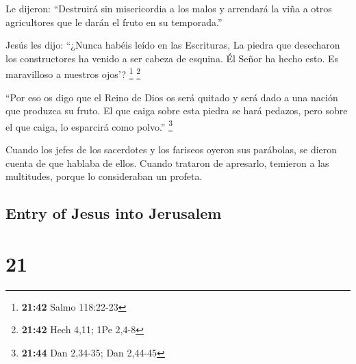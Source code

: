 \begin{paracol}{2}
 Le dijeron: ``Destruirá sin misericordia a los malos y
arrendará la viña a otros agricultores que le darán el fruto en su
temporada.''

 Jesús les dijo: ``¿Nunca habéis leído en las Escrituras,
La piedra que desecharon los constructores ha venido a ser cabeza de
esquina. Él Señor ha hecho esto. Es maravilloso a nuestros ojos'?
\footnote{\textbf{21:42} Salmo 118:22-23} \footnote{\textbf{21:42} Hech
  4,11; 1Pe 2,4-8}

 ``Por eso os digo que el Reino de Dios os será quitado y
será dado a una nación que produzca su fruto.  El que
caiga sobre esta piedra se hará pedazos, pero sobre el que caiga, lo
esparcirá como polvo.'' \footnote{\textbf{21:44} Dan 2,34-35; Dan
  2,44-45}

 Cuando los jefes de los sacerdotes y los fariseos oyeron
sus parábolas, se dieron cuenta de que hablaba de ellos. 
Cuando trataron de apresarlo, temieron a las multitudes, porque lo
consideraban un profeta.

\switchcolumn
\begin{otherlanguage}{english}

\hypertarget{entry-of-jesus-into-jerusalem}{%
\subsection{Entry of Jesus into
Jerusalem}\label{entry-of-jesus-into-jerusalem}}

\hypertarget{section-41}{%
\section{21}\label{section-41}}


\end{otherlanguage}
\end{paracol}
